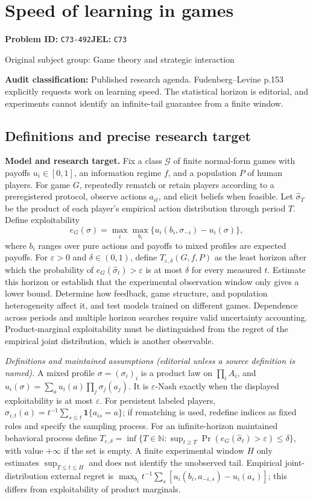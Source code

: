 \documentclass[11pt,a4paper]{article}
\begin{document}
\section*{Speed of learning in games}
\textbf{Problem ID:} \texttt{C73-492}\quad \textbf{JEL:} \texttt{C73}\par
\label{problem:OP-0280}
{\sffamily\small\color{muted}Original subject group: Game theory and strategic interaction\par}
\label{definitions:problem:30007562}
\textbf{Audit classification:} Published research agenda. Fudenberg–Levine p.153 explicitly requests work on learning speed. The statistical horizon is editorial, and experiments cannot identify an infinite-tail guarantee from a finite window.
\subsection*{Definitions and precise research target}
\textbf{Model and research target.} Fix a class \(\mathcal G\) of finite normal-form games with payoffs \(u_i\in[0,1]\), an information regime \(f\), and a population \(P\) of human players. For game \(G\), repeatedly rematch or retain players according to a preregistered protocol, observe actions \(a_{it}\), and elicit beliefs when feasible. Let \(\widehat\sigma_T\) be the product of each player's empirical action distribution through period \(T\). Define exploitability
\[
 e_G(\sigma)=\max_i\max_{b_i}\{u_i(b_i,\sigma_{-i})-u_i(\sigma)\},
\]
where \(b_i\) ranges over pure actions and payoffs to mixed profiles are expected payoffs. For \(\varepsilon>0\) and \(\delta\in(0,1)\), define \(T_{\varepsilon,\delta}(G,f,P)\) as the least horizon after which the probability of \(e_G(\widehat\sigma_t)>\varepsilon\) is at most \(\delta\) for every measured \(t\). Estimate this horizon or establish that the experimental observation window only gives a lower bound. Determine how feedback, game structure, and population heterogeneity affect it, and test models trained on different games. Dependence across periods and multiple horizon searches require valid uncertainty accounting. Product-marginal exploitability must be distinguished from the regret of the empirical joint distribution, which is another observable.

\emph{Definitions and maintained assumptions (editorial unless a source definition is named).} A mixed profile \(\sigma=(\sigma_i)_i\) is a product law on \(\prod_i A_i\), and \(u_i(\sigma)=\sum_a u_i(a)\prod_j\sigma_j(a_j)\). It is \(\varepsilon\)-Nash exactly when the displayed exploitability is at most \(\varepsilon\). For persistent labeled players, \(\widehat\sigma_{i,t}(a)=t^{-1}\sum_{s\le t}\mathbf1\{a_{is}=a\}\); if rematching is used, redefine indices as fixed roles and specify the sampling process. For an infinite-horizon maintained behavioral process define \(T_{\varepsilon,\delta}=\inf\{T\in\mathbb N:\sup_{t\ge T}\Pr(e_G(\widehat\sigma_t)>\varepsilon)\le\delta\}\), with value \(+\infty\) if the set is empty. A finite experimental window \(H\) only estimates \(\sup_{T\le t\le H}\) and does not identify the unobserved tail. Empirical joint-distribution external regret is \(\max_{b_i}t^{-1}\sum_s[u_i(b_i,a_{-i,s})-u_i(a_s)]\); this differs from exploitability of product marginals.
\end{document}
